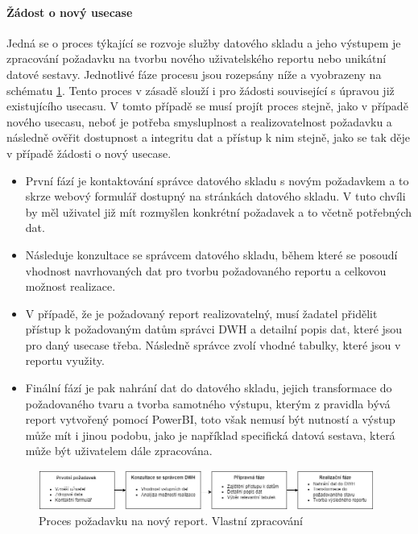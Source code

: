 \documentclass[
  digital,     %
  twoside,     %
  lof,         %
  lot,         %
]{fithesis4}
\begin{document}
\paragraph{Žádost o nový usecase} Jedná se o proces týkající se rozvoje služby datového skladu a jeho výstupem je zpracování požadavku na tvorbu nového uživatelského reportu nebo unikátní datové sestavy. Jednotlivé fáze procesu jsou rozepsány níže a vyobrazeny na schématu \ref{fig:new_report}. Tento proces v zásadě slouží i pro žádosti související s úpravou již existujícího usecasu. V tomto případě se musí projít proces stejně, jako v případě nového usecasu, neboť je potřeba smysluplnost a realizovatelnost požadavku a následně ověřit dostupnost a integritu dat a přístup k nim stejně, jako se tak děje v případě žádosti o nový usecase.
\begin{itemize}
    \item První fází je kontaktování správce datového skladu s novým požadavkem a to skrze webový formulář dostupný na stránkách datového skladu. V tuto chvíli by měl uživatel již mít rozmyšlen konkrétní požadavek a to včetně potřebných dat. 
    \item Následuje konzultace se správcem datového skladu, během které se posoudí vhodnost navrhovaných dat pro tvorbu požadovaného reportu a celkovou možnost realizace.
    \item V případě, že je požadovaný report realizovatelný, musí žadatel přidělit přístup k požadovaným datům správci DWH a detailní popis dat, které jsou pro daný usecase třeba. Následně správce zvolí vhodné tabulky, které jsou v reportu využity.
    \item Finální fází je pak nahrání dat do datového skladu, jejich transformace do požadovaného tvaru a tvorba samotného výstupu, kterým z pravidla bývá report vytvořený pomocí PowerBI, toto však nemusí být nutností a výstup může mít i jinou podobu, jako je například specifická datová sestava, která může být uživatelem dále zpracována. 
\end{itemize}
    \begin{figure}[t]
        \begin{center}
            \includegraphics[width=11cm]{img/new_usecase.png}
        \end{center}
        \caption{Proces požadavku na nový report. Vlastní zpracování}
        \label{fig:new_report}
    \end{figure} 
\end{document}
